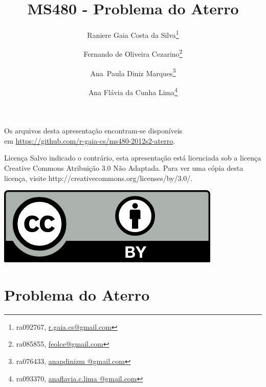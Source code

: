\documentclass[11pt]{beamer}
\begin{document}
\title{MS480 - Problema do Aterro}
\author[Silva, Cezarino, Marques e Lima]{Raniere Gaia Costa da Silva\footnote{ra092767,
\url{r.gaia.cs@gmail.com}} \and Fernando de Oliveira Cezarino\footnote{ra085855,
\url{feolce@gmail.com}} \and Ana~Paula Diniz Marques\footnote{ra076433,
\url{anapdinizm @gmail.com}} \and Ana Flávia da Cunha Lima\footnote{ra093370,
\url{anaflavia.c.lima @gmail.com}}}

\begin{frame}
    \maketitle
\end{frame}

\begin{frame}
    \begin{block}{}
        Os arquivos desta apresentação encontram-se disponíveis \\
        em \url{https://github.com/r-gaia-cs/ms480-2012s2-aterro}.
    \end{block}

    \begin{block}{Licença}
        Salvo indicado o contrário, esta apresentação está licenciada sob a licença
        Creative Commons Atribuição 3.0 Não Adaptada. Para ver uma cópia desta
        licença, visite http://creativecommons.org/licenses/by/3.0/.
        \begin{center}
            \includegraphics{../figuras/cc-by.png}
        \end{center}
    \end{block}
\end{frame}

\begin{frame}
    \tableofcontents
\end{frame}

\section{Problema do Aterro}
\end{document}
